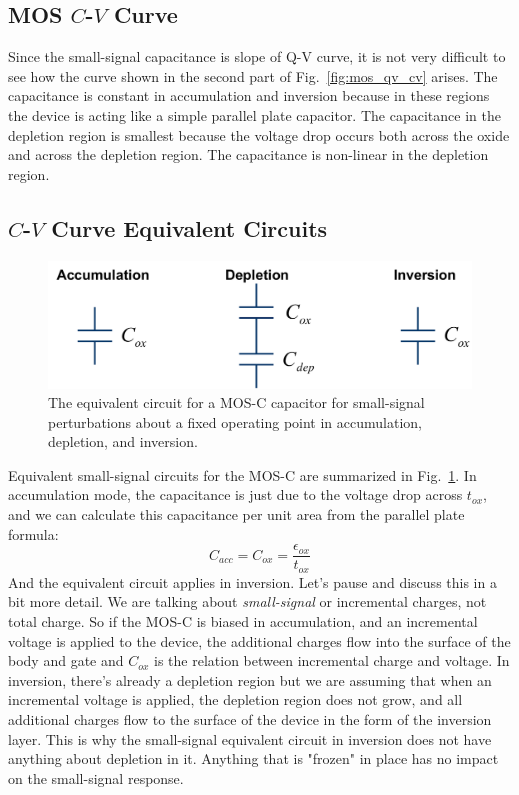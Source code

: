 \subsection{MOS \texorpdfstring{$C$-$V$}{C-V} Curve}
Since the small-signal capacitance is slope of Q-V curve, it is not very difficult to see how the curve shown in the second part of Fig.~\ref{fig:mos_qv_cv} arises.  The capacitance is constant in accumulation and inversion because in these regions the device is acting like a simple parallel plate capacitor.  The capacitance in the depletion region is smallest because the voltage drop occurs both across the oxide and across the depletion region.  The capacitance is non-linear in the depletion region.  
\subsection{\texorpdfstring{$C$-$V$}{C-V} Curve Equivalent Circuits}
\begin{figure}[tbh]
\centering
\includegraphics[width=.85\columnwidth]{mos_cv_circuits}
\caption{The equivalent circuit for a MOS-C capacitor for small-signal perturbations about a fixed operating point in accumulation, depletion, and inversion.}
\label{fig:mos_cv_circuits}
\end{figure}
Equivalent small-signal circuits for the MOS-C are summarized in Fig.~\ref{fig:mos_cv_circuits}.   In accumulation mode, the capacitance is just due to the voltage drop across $t_{ox}$, and we can calculate this capacitance per unit area from the parallel plate formula:
    \begin{equation}
        C_{acc} = C_{ox} = \frac{\epsilon_{ox}}{t_{ox}}
    \end{equation}
And the equivalent circuit applies in inversion.  Let's pause and discuss this in a bit more detail.  We are talking about \emph{small-signal} or incremental charges, not total charge.   So if the MOS-C is biased in accumulation, and an incremental voltage is applied to the device, the additional charges flow into the surface of the body and gate and $C_{ox}$ is the relation between incremental charge and voltage.  In inversion, there's already a depletion region but we are assuming that when an incremental voltage is applied, the depletion region does not grow, and all additional charges flow to the surface of the device in the form of the inversion layer. This is why the small-signal equivalent circuit in inversion does not have anything about depletion in it.  Anything that is "frozen" in place has no impact on the small-signal response.
